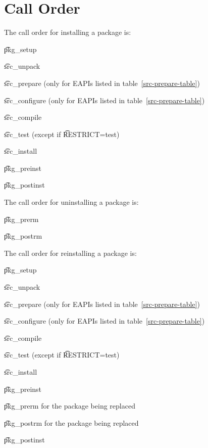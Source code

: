 \section{Call Order}

The call order for installing a package is:

\begin{compactitem}
\item \t{pkg\_setup}
\item \t{src\_unpack}
\item \t{src\_prepare} (only for EAPIs listed in table~\ref{src-prepare-table})
\item \t{src\_configure} (only for EAPIs listed in table~\ref{src-prepare-table})
\item \t{src\_compile}
\item \t{src\_test} (except if \t{RESTRICT=test})
\item \t{src\_install}
\item \t{pkg\_preinst}
\item \t{pkg\_postinst}
\end{compactitem}

The call order for uninstalling a package is:

\begin{compactitem}
\item \t{pkg\_prerm}
\item \t{pkg\_postrm}
\end{compactitem}

The call order for reinstalling a package is:

\begin{compactitem}
\item \t{pkg\_setup}
\item \t{src\_unpack}
\item \t{src\_prepare} (only for EAPIs listed in table~\ref{src-prepare-table})
\item \t{src\_configure} (only for EAPIs listed in table~\ref{src-prepare-table})
\item \t{src\_compile}
\item \t{src\_test} (except if \t{RESTRICT=test})
\item \t{src\_install}
\item \t{pkg\_preinst}
\item \t{pkg\_prerm} for the package being replaced
\item \t{pkg\_postrm} for the package being replaced
\item \t{pkg\_postinst}
\end{compactitem}

